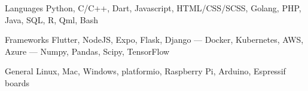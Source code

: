 
\begin{cvskills}
  \cvskill
    {Languages} %
    {Python, C/C++, Dart, Javascript, HTML/CSS/SCSS, Golang, PHP, Java, SQL, R, Qml, Bash} %

  \cvskill
    {Frameworks} %
    {Flutter, NodeJS, Expo, Flask, Django --- Docker, Kubernetes, AWS, Azure --- Numpy, Pandas, Scipy, TensorFlow} %

  \cvskill
    {General} %
    {Linux, Mac, Windows, platformio, Raspberry Pi, Arduino, Espressif boards} %

\end{cvskills}
